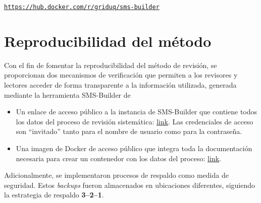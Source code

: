 \begin{center}
	\href{https://hub.docker.com/r/griduq/sms-builder}{\texttt{https://hub.docker.com/r/griduq/sms-builder}}
\end{center}



\section{Reproducibilidad del método}
\noindent
Con el fin de fomentar la reproducibilidad del método de revisión, se proporcionan dos mecanismos de verificación que permiten a los revisores y lectores acceder de forma transparente a la información utilizada, generada mediante la herramienta SMS-Builder de~\cite{SMSBuilder2020}
\begin{itemize}
	\item Un enlace de acceso público a la instancia de SMS-Builder que contiene todos los datos del proceso de revisión sistemática: \href{https://sms-vbc.iti.grid.uniquindio.edu.co/sms.xhtml}{link}. Las credenciales de acceso son ``invitado'' tanto para el nombre de usuario como para la contraseña.
	\item Una imagen de Docker de acceso público que integra toda la documentación necesaria para crear un contenedor con los datos del proceso: \href{https://hub.docker.com/r/anubis1001/tg-vbc-sms-builder}{link}.
\end{itemize}

\noindent
Adicionalmente, se implementaron procesos de respaldo como medida de seguridad. Estos \textit{backups} fueron almacenados en ubicaciones diferentes, siguiendo la estrategia de respaldo \textbf{3--2--1}.


